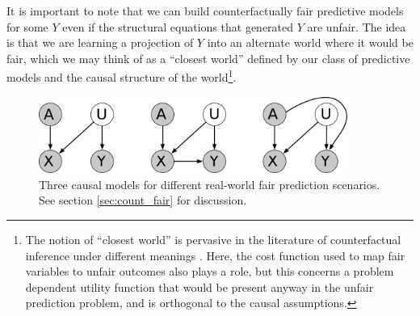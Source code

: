 It is important to note that we can build counterfactually fair
predictive models for some $Y$ even if the 
structural equations that generated $Y$ are unfair. The idea is that we
are learning a projection of $Y$ into an alternate world where it
would be fair, which we may think of as a
``closest world'' defined by our class of predictive models and the
causal structure of the world\footnote{The notion of ``closest world''
  is pervasive in the literature of counterfactual inference under
  different meanings \citep{pearl:00, halpern:16}.  Here, the cost
  function used to map fair variables to unfair outcomes also plays a
  role, but this concerns a problem dependent utility function that
  would be present anyway in the unfair prediction problem, and is
  orthogonal to the causal assumptions.}.







\begin{figure}[th]
\begin{center}
\vspace{-1.5ex}
\centerline{\includegraphics[width=0.9\textwidth]{simple_models_no_q2}}
\vspace{-2ex}
\caption{Three causal models for different real-world fair prediction scenarios.\label{figure.simple_models} See section \ref{sec:count_fair} for discussion.\vspace{-5ex}}
\vspace{-2ex}
\end{center}
\end{figure}

